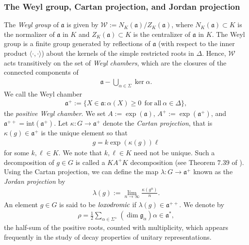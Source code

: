 \documentclass[psamsfonts]{amsart}
\theoremstyle{definition}
\theoremstyle{remark}
\numberwithin{equation}{section}
\begin{document}
\subsubsection{The Weyl group, Cartan projection, and Jordan projection}
 The \emph{Weyl group} of $\mathfrak{a}$ is given by $\mathcal{W} := N_{K}(\mathfrak{a}) / Z_{K}(\mathfrak{a})$, where $N_{K}(\mathfrak{a}) \subset K$ is the normalizer of $\mathfrak{a}$ in $K$ and $Z_{K}(\mathfrak{a}) \subset K$ is the centralizer of $\mathfrak{a}$ in $K$. The Weyl group is a finite group generated by reflections of $\mathfrak{a}$ (with respect to the inner product $\langle \cdot, \cdot \rangle$) about the kernels of the simple restricted roots in $\Delta$. Hence, $\mathcal{W}$ acts transitively on the set of \emph{Weyl chambers}, which are the closures of the connected components of 
\begin{align*}
    \mathfrak{a} - \bigcup_{\alpha \in \Sigma} \ker \alpha.
\end{align*} We call the Weyl chamber 
\begin{align*}
    \mathfrak{a}^{+} := \{X \in \mathfrak{a} : \alpha (X) \geq 0 \ \ \mathrm{for \ all} \ \alpha \in \Delta \},
\end{align*} the \emph{positive Weyl chamber}. We set $A := \exp (\mathfrak{a})$, $A^{+} := \exp (\mathfrak{a}^{+})$, and $\mathfrak{a}^{++} = \mathrm{int}(\mathfrak{a}^{+})$. Let $\kappa : G \rightarrow \mathfrak{a}^{+}$ denote the \emph{Cartan projection}, that is $\kappa (g) \in \mathfrak{a}^{+}$ is the unique element so that 
\begin{align*}
    g = k \exp (\kappa (g)) \ell
\end{align*} for some $k, \ell \in K$. We note that $k, \ell \in K$ need not be unique. Such a decomposition of $g \in G$ is called a $KA^{+}K$ decomposition (see Theorem $7.39$ of \cite{Kn1}). Using the Cartan projection, we can define the map $\lambda : G \rightarrow \mathfrak{a}^{+}$ known as the \emph{Jordan projection} by 
\begin{align*}
\lambda(g) := \lim_{n \to \infty} \frac{\kappa(g^{n})}{n}.
\end{align*} An element $g \in G$ is said to be $\emph{loxodromic}$ if $\lambda(g) \in \mathfrak{a}^{++}$. We denote by 
\begin{align*}
\rho = \frac{1}{2} \sum_{\alpha \in \Sigma^{+}} (\dim \mathfrak{g}_{\alpha}) \alpha \in \mathfrak{a}^{*},
\end{align*} the half-sum of the positive roots, counted with multiplicity, which appears frequently in the study of decay properties of unitary representations. 
\end{document}
